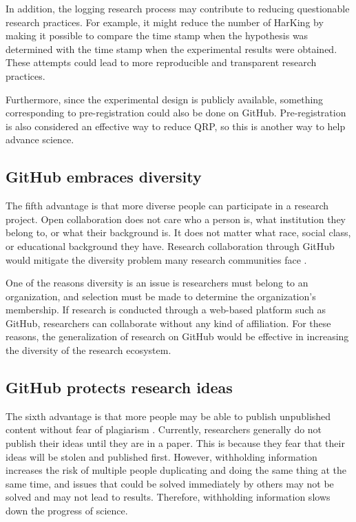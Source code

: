 \documentclass{article}
\begin{document}
In addition, the logging research process may contribute to reducing questionable research practices. For example, it might reduce the number of HarKing by making it possible to compare the time stamp when the hypothesis was determined with the time stamp when the experimental results were obtained. These attempts could lead to more reproducible and transparent research practices.

Furthermore, since the experimental design is publicly available, something corresponding to pre-registration could also be done on GitHub. Pre-registration is also considered an effective way to reduce QRP, so this is another way to help advance science.

\subsection{GitHub embraces diversity}
The fifth advantage is that more diverse people can participate in a research project. Open collaboration does not care who a person is, what institution they belong to, or what their background is. It does not matter what race, social class, or educational background they have. Research collaboration through GitHub would mitigate the diversity problem many research communities face \cite{west2019discriminating}.

One of the reasons diversity is an issue is researchers must belong to an organization, and selection must be made to determine the organization's membership. If research is conducted through a web-based platform such as GitHub, researchers can collaborate without any kind of affiliation. For these reasons, the generalization of research on GitHub would be effective in increasing the diversity of the research ecosystem.

\subsection{GitHub protects research ideas}
The sixth advantage is that more people may be able to publish unpublished content without fear of plagiarism \cite{anderson2011problem}. Currently, researchers generally do not publish their ideas until they are in a paper. This is because they fear that their ideas will be stolen and published first. However, withholding information increases the risk of multiple people duplicating and doing the same thing at the same time, and issues that could be solved immediately by others may not be solved and may not lead to results. Therefore, withholding information slows down the progress of science.
\end{document}
